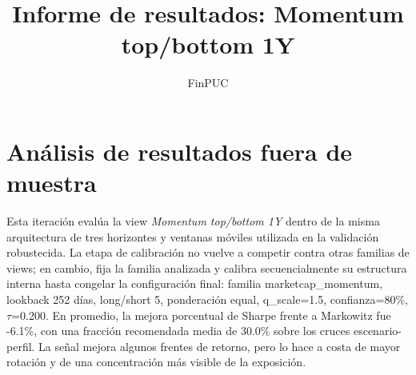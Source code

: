 \documentclass[11pt]{article}
\title{Informe de resultados: Momentum top/bottom 1Y}
\author{FinPUC}
\date{}
\begin{document}
\maketitle

\section{Análisis de resultados fuera de muestra}
Esta iteración evalúa la view \textit{Momentum top/bottom 1Y} dentro de la misma arquitectura de tres horizontes y ventanas móviles utilizada en la validación robustecida. La etapa de calibración no vuelve a competir contra otras familias de views; en cambio, fija la familia analizada y calibra secuencialmente su estructura interna hasta congelar la configuración final: familia marketcap\_momentum, lookback 252 días, long/short 5, ponderación equal, q\_scale=1.5, confianza=80\%, $\tau$=0.200.
En promedio, la mejora porcentual de Sharpe frente a Markowitz fue -6.1\%, con una fracción recomendada media de 30.0\% sobre los cruces escenario-perfil. La señal mejora algunos frentes de retorno, pero lo hace a costa de mayor rotación y de una concentración más visible de la exposición.
\begin{table}[H]
\centering
{}
\caption{Comparación fuera de muestra en horizonte limpio para Momentum top/bottom 1Y.}
\label{tab:momentum_top_bottom_1y:resultados_oos}
\end{table}
\end{document}
